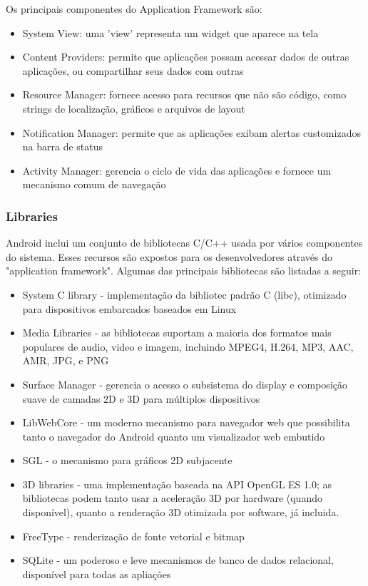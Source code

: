 \documentclass[a4paper,12pt]{report}
\begin{document}
Os principais componentes do Application Framework são:
\begin{itemize}
\sloppy %
    \item System View: uma 'view' representa um widget que aparece na tela
    \item Content Providers: permite que aplicações possam acessar dados de outras 
    aplicações, ou compartilhar seus dados com outras
    \item Resource Manager: fornece acesso para recursos que não são código, como 
    strings de localização, gráficos e arquivos de layout
    \item Notification Manager: permite que as aplicações exibam alertas customizados 
    na barra de status
    \item Activity Manager: gerencia o ciclo de vida das aplicações e fornece um 
    mecanismo comum de navegação
\fussy %
\end{itemize}

\subsubsection{Libraries}
Android inclui um conjunto de bibliotecas C/C++ usada por vários componentes do 
sistema. Esses recursos são expostos para os desenvolvedores através do "application 
framework". Algumas das principais bibliotecas são listadas a seguir:

\begin{itemize}
    \item System C library - implementação da bibliotec padrão C (libc), otimizado
    para dispositivos embarcados baseados em Linux
    \item Media Libraries - as bibliotecas suportam a maioria dos formatos mais 
    populares de audio, video e imagem, incluindo MPEG4, H.264, MP3, AAC, AMR, 
    JPG, e PNG
    \item Surface Manager - gerencia o acesso o subsistema do display e composição 
    suave de camadas 2D e 3D para múltiplos dispositivos
    \item LibWebCore - um moderno mecanismo para navegador web que possibilita tanto o 
    navegador do Android quanto um visualizador web embutido
    \item SGL - o mecanismo para gráficos 2D subjacente
    \item 3D libraries - uma implementação baseada na API OpenGL ES 1.0; as bibliotecas
    podem tanto usar a aceleração 3D por hardware (quando disponível), quanto
    a renderação 3D otimizada por software, já incluida.
    \item FreeType - renderização de fonte vetorial e bitmap
    \item SQLite - um poderoso e leve mecanismos de banco de dados relacional, 
    disponível para todas as apliações
\end{itemize}
\end{document}
